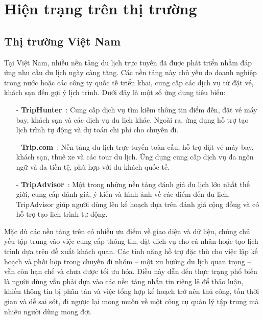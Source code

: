 \section{Hiện trạng trên thị trường}
\subsection{Thị trường Việt Nam}

Tại Việt Nam, nhiều nền tảng du lịch trực tuyến đã được phát triển nhằm đáp ứng nhu cầu du lịch ngày càng tăng. Các nền tảng này chủ yếu do doanh nghiệp trong nước hoặc các công ty quốc tế triển khai, cung cấp các dịch vụ từ đặt vé, khách sạn đến gợi ý lịch trình. Dưới đây là một số ứng dụng tiêu biểu:

\begin{itemize}
    \item[-]\textbf{TripHunter}~\cite{triphunter}: Cung cấp dịch vụ tìm kiếm thông tin điểm đến, đặt vé máy bay, khách sạn và các dịch vụ du lịch khác. Ngoài ra, ứng dụng hỗ trợ tạo lịch trình tự động và dự toán chi phí cho chuyến đi.

    \item[-]\textbf{Trip.com}~\cite{tripcom}: Nền tảng du lịch trực tuyến toàn cầu, hỗ trợ đặt vé máy bay, khách sạn, thuê xe và các tour du lịch. Ứng dụng cung cấp dịch vụ đa ngôn ngữ và đa tiền tệ, phù hợp với du khách quốc tế.

    \item[-]\textbf{TripAdvisor}~\cite{tripadvisor}: Một trong những nền tảng đánh giá du lịch lớn nhất thế giới, cung cấp đánh giá, ý kiến và hình ảnh về các điểm đến du lịch. TripAdvisor giúp người dùng lên kế hoạch dựa trên đánh giá cộng đồng và có hỗ trợ tạo lịch trình tự động.


\end{itemize}

Mặc dù các nền tảng trên có nhiều ưu điểm về giao diện và dữ liệu, chúng chủ yếu tập trung vào việc cung cấp thông tin, đặt dịch vụ cho cá nhân hoặc tạo lịch trình dựa trên đề xuất khách quan. Các tính năng hỗ trợ đặc thù cho việc lập kế hoạch và phối hợp trong chuyến đi nhóm – một xu hướng du lịch quan trọng – vẫn còn hạn chế và chưa được tối ưu hóa. Điều này dẫn đến thực trạng phổ biến là người dùng vẫn phải dựa vào các nền tảng nhắn tin riêng lẻ để thảo luận, khiến thông tin bị phân tán và việc tổng hợp kế hoạch trở nên thủ công, tốn thời gian và dễ sai sót, đi ngược lại mong muốn về một công cụ quản lý tập trung mà nhiều người dùng mong đợi. %

